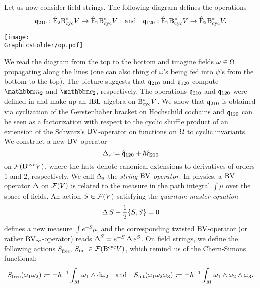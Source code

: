 \documentclass[\MainFolder/Text.tex]{subfiles}
\begin{document}
Let us now consider field strings. The following diagram defines the operations $$ \mathfrak{q}_{210}: \hat{\mathrm{E}}_2 \mathrm{B}_{\mathrm{cyc}}^* V \rightarrow \hat{\mathrm{E}}_1\mathrm{B}_{\mathrm{cyc}}^* V \quad\text{and}\quad \mathfrak{q}_{120}: \hat{\mathrm{E}}_1\mathrm{B}_{\mathrm{cyc}}^* V \rightarrow \hat{\mathrm{E}}_2\mathrm{B}_{\mathrm{cyc}}^* V .$$
\begin{center}
 \texttt{[image: \\GraphicsFolder/op.pdf]}
\end{center}
We read the diagram from the top to the bottom and imagine fields $\omega\in \Omega$ propagating along the lines (one can also thing of $\omega$'s being fed into $\psi$'s from the bottom to the top).
%
The picture suggests that $\mathfrak{q}_{210}$ and $\mathfrak{q}_{120}$ compute $\StringOp_2$ and $\StringCoOp_2$, respectively. The operations $\mathfrak{q}_{210}$ and $\mathfrak{q}_{120}$ were defined in \cite{Cieliebak2015} and make up an $\mathrm{IBL}$-algebra on $\mathrm{B}_{\mathrm{cyc}}^* V$. We show that $\mathfrak{q}_{210}$ is obtained via cyclization of the Gerstenhaber bracket on Hochschild cochains and $\mathfrak{q}_{120}$ can be seen as a factorization with respect to the cyclic shuffle product of an extension of the Schwarz's $\mathrm{BV}$-operator on functions on $\Omega$ to cyclic invariants. We construct a new $\mathrm{BV}$-operator
$$ \operatorname{\Delta}_{\mathrm{s}} \coloneqq  \hat{\mathfrak{q}}_{120} + \hbar \hat{\mathfrak{q}}_{210} $$
on $\mathcal{F}(\mathrm{B}^{\mathrm{cyc}} V)$, where the hats denote canonical extensions to derivatives of orders $1$ and $2$, respectively. We call $\operatorname{\Delta}_{\mathrm{s}}$ the \emph{string $\mathrm{BV}$-operator.} In physics, a $\mathrm{BV}$-operator $\operatorname{\Delta}$ on $\mathcal{F}(V)$ is related to the measure in the path integral $\int \mu$ over the space of fields. An action $S\in \mathcal{F}(V)$ satisfying the \emph{quantum master equation}
$$ \operatorname{\Delta} S + \frac{1}{2}\{S,S\} = 0 $$
defines a new measure $\int e^{-S} \mu$, and the corresponding twisted $\mathrm{BV}$-operator (or rather $\mathrm{BV}_\infty$-operator) reads $\operatorname{\Delta}^S = e^{-S} \operatorname{\Delta} e^{S}$. On field strings, we define the following actions $S_{\mathrm{free}}$, $S_{\mathrm{int}}\in \mathcal{F}(\mathrm{B}^{\mathrm{cyc}} V)$, which remind us of the Chern-Simons functional:
$$S_{\mathrm{free}}(\omega_1 \omega_2) \coloneqq \pm \hbar^{-1}\int_M \omega_1 \wedge \mathrm{d} \omega_2 \quad\text{and}\quad S_{\mathrm{int}}(\omega_1 \omega_2 \omega_3) \coloneqq \pm \hbar^{-1}\int_M \omega_1 \wedge \omega_2 \wedge \omega_3.
$$
\end{document}
